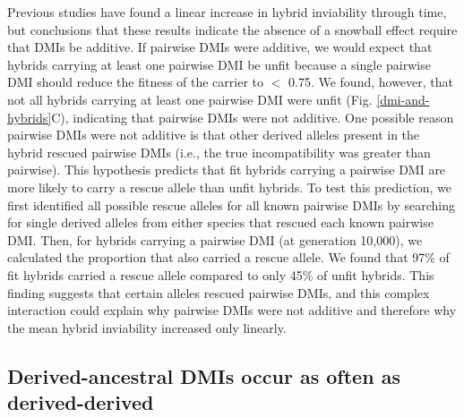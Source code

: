 \begin{doublespace}
Previous studies have found a linear increase
in hybrid inviability through time,
but conclusions that these results indicate the absence
of a snowball effect require that DMIs be additive.
%
If pairwise DMIs were additive, we would expect that hybrids
carrying at least one pairwise DMI be unfit
because a single pairwise DMI should reduce
the fitness of the carrier to $<$ 0.75.
%
We found, however, that not all hybrids
carrying at least one pairwise DMI were unfit
(Fig. \ref{dmi-and-hybrids}C),
indicating that pairwise DMIs were not additive.
%
One possible reason pairwise DMIs were not additive
is that other derived alleles present in the hybrid rescued pairwise DMIs
(i.e., the true incompatibility was greater than pairwise).
%
This hypothesis predicts that fit hybrids carrying a pairwise DMI
are more likely to carry a rescue allele than unfit hybrids.
%
To test this prediction,
we first identified all possible rescue alleles for all known pairwise DMIs
by searching for single derived alleles from either species
that rescued each known pairwise DMI.
%
Then, for hybrids carrying a pairwise DMI (at generation 10,000),
we calculated the proportion that also carried a rescue allele.
%
We found that 97\% of fit hybrids carried a rescue allele
compared to only 45\% of unfit hybrids.
%
This finding suggests that certain alleles rescued pairwise DMIs,
and this complex interaction could explain
why pairwise DMIs were not additive and therefore
why the mean hybrid inviability increased only linearly.



\subsection{Derived-ancestral DMIs occur as often as derived-derived}


\end{doublespace}
